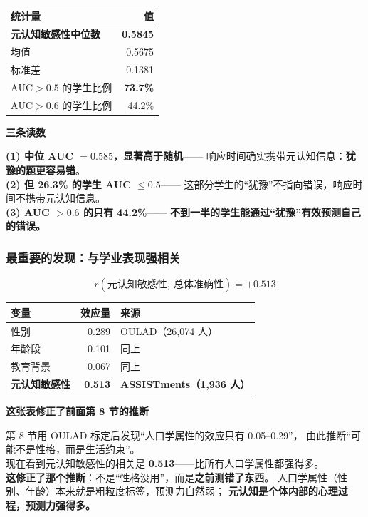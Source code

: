 \documentclass[UTF8,a4paper,11pt]{ctexart}
\newenvironment{explainbox}[1]
{\begin{center}\begin{minipage}{0.94\textwidth}\colorbox{boxbg}{\parbox{0.92\textwidth}{\textbf{#1}\par\vspace{2pt}}}}
{\end{minipage}\end{center}}
\begin{document}
\begin{center}
\begin{tabular}{lr}
\toprule
\textbf{统计量} & \textbf{值} \\
\midrule
\textbf{元认知敏感性中位数} & \textbf{0.5845} \\
均值 & 0.5675 \\
标准差 & 0.1381 \\
\midrule
$\text{AUC} > 0.5$ 的学生比例 & \textbf{73.7\%} \\
$\text{AUC} > 0.6$ 的学生比例 & 44.2\% \\
\bottomrule
\end{tabular}
\end{center}

\begin{explainbox}{三条读数}
\textbf{(1) 中位 AUC $=0.585$，显著高于随机}——
响应时间确实携带元认知信息：\textbf{犹豫的题更容易错}。\\[4pt]
\textbf{(2) 但 26.3\% 的学生 AUC $\le 0.5$}——
这部分学生的“犹豫”不指向错误，响应时间不携带元认知信息。\\[4pt]
\textbf{(3) AUC $>0.6$ 的只有 44.2\%}——
\textbf{不到一半的学生能通过“犹豫”有效预测自己的错误。}
\end{explainbox}

\subsubsection{最重要的发现：与学业表现强相关}

\begin{equation}
r(\text{元认知敏感性},\ \text{总体准确性}) = +0.513
\end{equation}

\begin{center}
\begin{tabular}{p{6.0cm}rp{4.0cm}}
\toprule
\textbf{变量} & \textbf{效应量} & \textbf{来源} \\
\midrule
性别 & 0.289 & OULAD（26{,}074 人） \\
年龄段 & 0.101 & 同上 \\
教育背景 & 0.067 & 同上 \\
\midrule
\textbf{元认知敏感性} & \textbf{0.513} & \textbf{ASSISTments（1{,}936 人）} \\
\bottomrule
\end{tabular}
\end{center}

\begin{explainbox}{这张表修正了前面第 8 节的推断}
第 8 节用 OULAD 标定后发现“人口学属性的效应只有 0.05--0.29”，
由此推断“可能不是性格，而是生活约束”。\\[4pt]
现在看到元认知敏感性的相关是 \textbf{0.513}——比所有人口学属性都强得多。\\[4pt]
\textbf{这修正了那个推断}：不是“性格没用”，而是\textbf{之前测错了东西}。
人口学属性（性别、年龄）本来就是粗粒度标签，预测力自然弱；
\textbf{元认知是个体内部的心理过程，预测力强得多。}
\end{explainbox}
\end{document}
